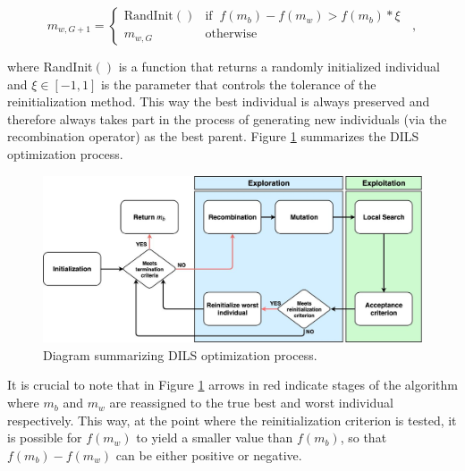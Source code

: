 \documentclass[review]{elsarticle}
\begin{document}
\begin{equation}
m_{w,G+1} = \left\{ \begin{array}{lc}
\text{RandInit}() &   \text{if} \;\; f(m_b) - f(m_w) > f(m_b) * \xi \;\;\\
m_{w,G} &  \text{otherwise}
\end{array}
\right.,
\label{eq2}
\end{equation}

\noindent where RandInit$()$ is a function that returns a randomly initialized individual and $\xi \in [-1,1]$ is the parameter that controls the tolerance of the reinitialization method. This way the best individual is always preserved and therefore always takes part in the process of generating new individuals (via the recombination operator) as the best parent. Figure \ref{img:DILS_diag} summarizes the DILS optimization process.

\begin{figure}[!h]
	\centering
	\includegraphics[scale=0.25]{Figures/DILSDiagram.jpg}
	\caption{Diagram summarizing DILS optimization process.}\label{img:DILS_diag}
\end{figure}

It is crucial to note that in Figure \ref{img:DILS_diag} arrows in red indicate stages of the algorithm where $m_b$ and $m_w$ are reassigned to the true best and worst individual respectively. This way, at the point where the reinitialization criterion is tested, it is possible for $f(m_w)$ to yield a smaller value than $f(m_b)$, so that $f(m_b) - f(m_w)$ can be either positive or negative. 
\end{document}
